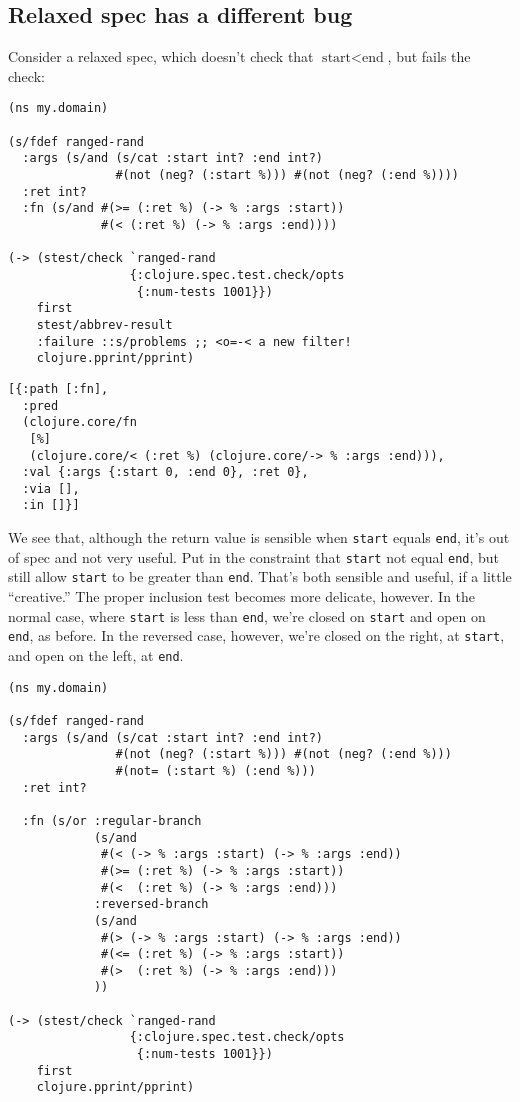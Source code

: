 \documentclass[10pt,oneside,x11names]{article}
\begin{document}
\subsection{Relaxed spec has a different bug}
\label{sec:org1d5071e}

Consider a relaxed spec, which doesn't check that
\(\textrm{start} < \textrm{end}\), but fails the check:

\begin{verbatim}
(ns my.domain)

(s/fdef ranged-rand
  :args (s/and (s/cat :start int? :end int?)
               #(not (neg? (:start %))) #(not (neg? (:end %))))
  :ret int?
  :fn (s/and #(>= (:ret %) (-> % :args :start))
             #(< (:ret %) (-> % :args :end))))

(-> (stest/check `ranged-rand
                 {:clojure.spec.test.check/opts
                  {:num-tests 1001}})
    first
    stest/abbrev-result
    :failure ::s/problems ;; <o=-< a new filter!
    clojure.pprint/pprint)
\end{verbatim}

\begin{verbatim}
[{:path [:fn],
  :pred
  (clojure.core/fn
   [%]
   (clojure.core/< (:ret %) (clojure.core/-> % :args :end))),
  :val {:args {:start 0, :end 0}, :ret 0},
  :via [],
  :in []}]
\end{verbatim}


We see that, although the return value is sensible when \texttt{start} equals \texttt{end},
it's out of spec and not very useful. Put in the constraint that \texttt{start} not
equal \texttt{end}, but still allow \texttt{start} to be greater than \texttt{end}. That's both
sensible and useful, if a little ``creative.'' The proper inclusion test becomes
more delicate, however. In the normal case, where \texttt{start} is less than \texttt{end},
we're closed on \texttt{start} and open on \texttt{end}, as before. In the reversed case,
however, we're closed on the right, at \texttt{start}, and open on the left, at \texttt{end}.

\begin{verbatim}
(ns my.domain)

(s/fdef ranged-rand
  :args (s/and (s/cat :start int? :end int?)
               #(not (neg? (:start %))) #(not (neg? (:end %)))
               #(not= (:start %) (:end %)))
  :ret int?

  :fn (s/or :regular-branch
            (s/and
             #(< (-> % :args :start) (-> % :args :end))
             #(>= (:ret %) (-> % :args :start))
             #(<  (:ret %) (-> % :args :end)))
            :reversed-branch
            (s/and
             #(> (-> % :args :start) (-> % :args :end))
             #(<= (:ret %) (-> % :args :start))
             #(>  (:ret %) (-> % :args :end)))
            ))

(-> (stest/check `ranged-rand
                 {:clojure.spec.test.check/opts
                  {:num-tests 1001}})
    first
    clojure.pprint/pprint)
\end{verbatim}
\end{document}
